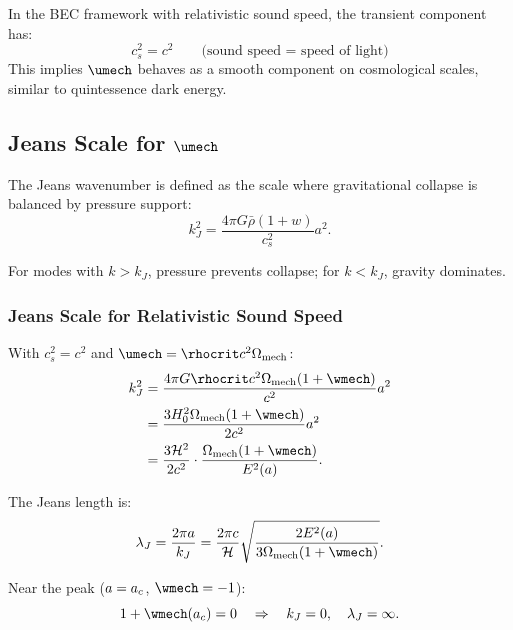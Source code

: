 \begin{proposition}
\label{prop:cs_mech}
In the BEC framework with relativistic sound speed, the transient component has:
\begin{equation}
\boxed{c_s^2 = c^2 \qquad \text{(sound speed = speed of light)}}
\end{equation}
This implies $\umech$ behaves as a smooth component on cosmological scales, similar to quintessence dark energy.
\end{proposition}

\subsection{Jeans Scale for $\umech$}
\label{sec:jeans_scale}

The Jeans wavenumber is defined as the scale where gravitational collapse is balanced by pressure support:
\begin{equation}
\label{eq:kJ_definition}
k_J^2 = \frac{4\pi G \bar{\rho}(1+w)}{c_s^2} a^2.
\end{equation}

For modes with $k > k_J$, pressure prevents collapse; for $k < k_J$, gravity dominates.

\subsubsection{Jeans Scale for Relativistic Sound Speed}

With $c_s^2 = c^2$ and $\umech = \rhocrit c^2 \Omega_{\mathrm{mech}}$:
\begin{align}
k_J^2 &= \frac{4\pi G \rhocrit c^2 \Omega_{\mathrm{mech}}(1+\wmech)}{c^2} a^2 \\
&= \frac{3H_0^2 \Omega_{\mathrm{mech}}(1+\wmech)}{2c^2} a^2 \\
&= \frac{3\mathcal{H}^2}{2c^2} \cdot \frac{\Omega_{\mathrm{mech}}(1+\wmech)}{E^2(a)}.
\end{align}

The Jeans length is:
\begin{equation}
\lambda_J = \frac{2\pi a}{k_J} = \frac{2\pi c}{\mathcal{H}} \sqrt{\frac{2E^2(a)}{3\Omega_{\mathrm{mech}}(1+\wmech)}}.
\end{equation}

Near the peak ($a = a_c$, $\wmech = -1$):
\begin{equation}
1 + \wmech(\ac) = 0 \quad \Rightarrow \quad k_J = 0, \quad \lambda_J = \infty.
\end{equation}

